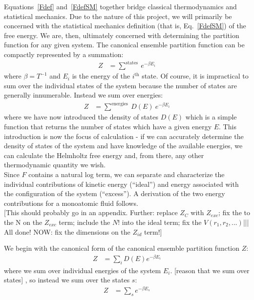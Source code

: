 \documentclass[12pt]{article}
\begin{document}
Equations~\ref{Fdef} and~\ref{FdefSM} together bridge classical thermodynamics and statistical mechanics. Due to the nature of this project, we will primarily be concerned with the statistical mechanics definition (that is, Eq.~\ref{FdefSM}) of the free energy. We are, then, ultimately concerned with determining the partition function for any given system. The canonical ensemble partition function can be compactly represented by a summation:
\begin{align}
    Z &= \sum^{\text{states}}~e^{-\beta E_i}
\end{align}
where $\beta =  T^{-1}$ and $E_i$ is the energy of the $i^{\text{th}}$ state. Of course, it is impractical to sum over the individual states of the system because the number of states are generally innumerable. Instead we sum over energies:
\begin{align}
    Z &= \sum^{\text{energies}}~D(E)~e^{-\beta E_i}
\end{align}
where we have now introduced the density of states $D(E)$ which is a simple function that returns the number of states which have a given energy $E$. This introduction is now the focus of calculation - if we can accurately determine the density of states of the system and have knowledge of the available energies, we can calculate the Helmholtz free energy and, from there, any other thermodynamic quantity we wish. \\   
Since $F$ contains a natural log term, we can separate and characterize the individual contributions of kinetic energy (``ideal'') and energy associated with the configuration of the system (``excess'').  
A derivation of the two energy contributions for a monoatomic fluid follows. \\

{\color{red} [This should probably go in an appendix. Further: replace $Z_C$ with $Z_{exc}$; fix the to the N on the $Z_{exc}$ term; include the $N!$ into the ideal term; fix the $V(r_1, r_2, ...)$||| All done! NOW: fix the dimensions on the $Z_{id}$ term!]}

We begin with the canonical form of the canonical ensemble partition function $Z$:
\begin{align}
    Z &= \sum_i D(E) e^{-\beta E_i}
\end{align}
where we sum over individual energies of the system $E_i$. [reason that we sum over states] , so instead we sum over the states $s$:
\begin{align}
    Z &= \sum_s e^{-\beta E_s}
\end{align} 
\end{document}
